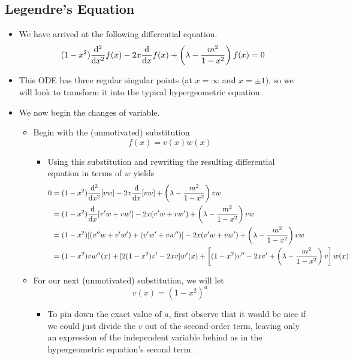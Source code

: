 \documentclass[../finalProject.tex]{subfiles}
\begin{document}
\subsection{Legendre's Equation}
\begin{itemize}
    \item We have arrived at the following differential equation.
    \begin{equation*}
        (1-x^2)\dv[2]{x}f(x)-2x\dv{x}f(x)+\left( \lambda-\frac{m^2}{1-x^2} \right)f(x) = 0
    \end{equation*}
    \item This ODE has three regular singular points (at $x=\infty$ and $x=\pm 1$), so we will look to transform it into the typical hypergeometric equation.
    \item We now begin the changes of variable.
    \begin{itemize}
        \item Begin with the (unmotivated) substitution
        \begin{equation*}
            f(x) = v(x)w(x)
        \end{equation*}
        \begin{itemize}
            \item Using this substitution and rewriting the resulting differential equation in terms of $w$ yields
            \begin{align*}
                0 &= (1-x^2)\dv[2]{x}[vw]-2x\dv{x}[vw]+\left( \lambda-\frac{m^2}{1-x^2} \right)vw\\
                &= (1-x^2)\dv{x}[v'w+vw']-2x(v'w+vw')+\left( \lambda-\frac{m^2}{1-x^2} \right)vw\\
                &= (1-x^2)[(v''w+v'w')+(v'w'+vw'')]-2x(v'w+vw')+\left( \lambda-\frac{m^2}{1-x^2} \right)vw\\
                &= (1-x^2)vw''(x)+[2(1-x^2)v'-2xv]w'(x)+\left[ (1-x^2)v''-2xv'+\left( \lambda-\frac{m^2}{1-x^2} \right)v \right]w(x)
            \end{align*}
        \end{itemize}
        \item For our next (unmotivated) substitution, we will let
        \begin{equation*}
            v(x) = (1-x^2)^a
        \end{equation*}
        \begin{itemize}
            \item To pin down the exact value of $a$, first observe that it would be nice if we could just divide the $v$ out of the second-order term, leaving only an expression of the independent variable behind as in the hypergeometric equation's second term.

\end{itemize}
\end{itemize}
\end{itemize}
\end{document}
